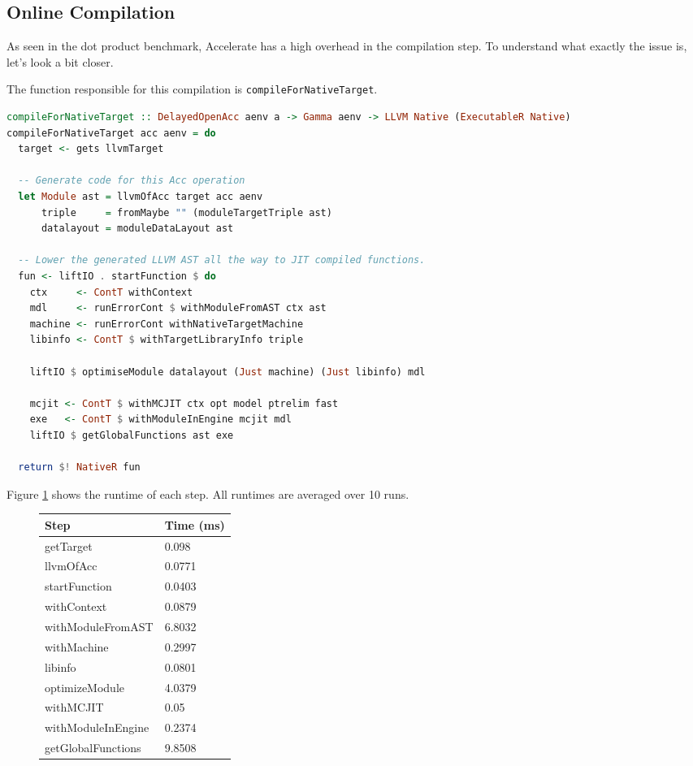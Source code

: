 \documentclass[a4paper,bibliography=totocnumbered,parskip,headsepline]{scrbook}
\begin{document}
\subsection{Online Compilation}
As seen in the dot product benchmark, Accelerate has a high overhead in the compilation step.
To understand what exactly the issue is, let's look a bit closer.

The function responsible for this compilation is \lstinline[language=haskell]{compileForNativeTarget}.

\begin{lstlisting}[language=haskell]
compileForNativeTarget :: DelayedOpenAcc aenv a -> Gamma aenv -> LLVM Native (ExecutableR Native)
compileForNativeTarget acc aenv = do
  target <- gets llvmTarget

  -- Generate code for this Acc operation
  let Module ast = llvmOfAcc target acc aenv
      triple     = fromMaybe "" (moduleTargetTriple ast)
      datalayout = moduleDataLayout ast

  -- Lower the generated LLVM AST all the way to JIT compiled functions.
  fun <- liftIO . startFunction $ do
    ctx     <- ContT withContext
    mdl     <- runErrorCont $ withModuleFromAST ctx ast
    machine <- runErrorCont withNativeTargetMachine
    libinfo <- ContT $ withTargetLibraryInfo triple

    liftIO $ optimiseModule datalayout (Just machine) (Just libinfo) mdl

    mcjit <- ContT $ withMCJIT ctx opt model ptrelim fast
    exe   <- ContT $ withModuleInEngine mcjit mdl
    liftIO $ getGlobalFunctions ast exe

  return $! NativeR fun
\end{lstlisting}

Figure \ref{fig:compile} shows the runtime of each step.
All runtimes are averaged over 10 runs.

\begin{figure}
    \centering
\begin{tabular}{ll}
Step             & Time (ms)   \\ \hline
getTarget        & 0.098  \\
llvmOfAcc              & 0.0771 \\
startFunction    & 0.0403 \\
withContext      & 0.0879 \\
withModuleFromAST       & 6.8032 \\
withMachine      & 0.2997 \\
libinfo          & 0.0801 \\
optimizeModule   & 4.0379 \\
withMCJIT        & 0.05   \\
withModuleInEngine   & 0.2374 \\
getGlobalFunctions & 9.8508 \\
\end{tabular}
    \label{fig:compile}
\end{figure}
\end{document}
